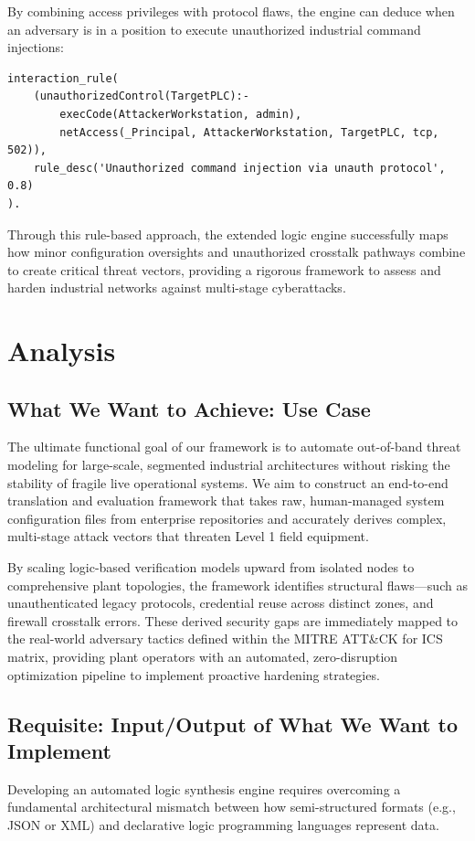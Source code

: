 \documentclass[target=mst,aauheader=aics,style=]{thud}
\begin{document}
By combining access privileges with protocol flaws, the engine can deduce when an adversary is in a position to execute unauthorized industrial command injections:
\begin{verbatim}
interaction_rule(
    (unauthorizedControl(TargetPLC):-
        execCode(AttackerWorkstation, admin),
        netAccess(_Principal, AttackerWorkstation, TargetPLC, tcp, 502)),
    rule_desc('Unauthorized command injection via unauth protocol', 0.8)
).
\end{verbatim}
Through this rule-based approach, the extended logic engine successfully maps how minor configuration oversights and unauthorized crosstalk pathways combine to create critical threat vectors, providing a rigorous framework to assess and harden industrial networks against multi-stage cyberattacks.


\chapter{Analysis}

\section{What We Want to Achieve: Use Case}
The ultimate functional goal of our framework is to automate out-of-band threat modeling for large-scale, segmented industrial architectures without risking the stability of fragile live operational systems. We aim to construct an end-to-end translation and evaluation framework that takes raw, human-managed system configuration files from enterprise repositories and accurately derives complex, multi-stage attack vectors that threaten Level 1 field equipment. 

By scaling logic-based verification models upward from isolated nodes to comprehensive plant topologies, the framework identifies structural flaws—such as unauthenticated legacy protocols, credential reuse across distinct zones, and firewall crosstalk errors. These derived security gaps are immediately mapped to the real-world adversary tactics defined within the MITRE ATT&CK for ICS matrix, providing plant operators with an automated, zero-disruption optimization pipeline to implement proactive hardening strategies.

\section{Requisite: Input/Output of What We Want to Implement}
Developing an automated logic synthesis engine requires overcoming a fundamental architectural mismatch between how semi-structured formats (e.g., JSON or XML) and declarative logic programming languages represent data.
\end{document}
